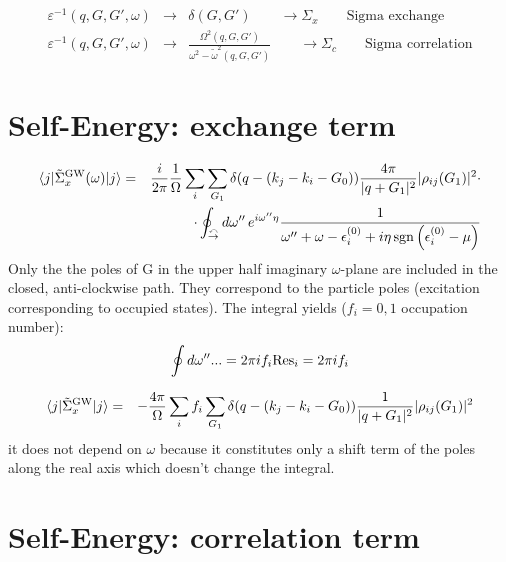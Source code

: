 \documentclass[fleqn]{article}
\begin{document}
\begin{eqnarray*}
\varepsilon^{-1}(q,G,G',\omega) &\rightarrow& \delta(G,G')
  \qquad \rightarrow \Sigma_x \qquad \textrm{Sigma exchange} \\
  \varepsilon^{-1}(q,G,G',\omega) &\rightarrow&
  \frac{\Omega^2(q,G,G')}{\omega^2 - \tilde{\omega}^2(q,G,G')}
  \qquad \rightarrow \Sigma_c \qquad \textrm{Sigma correlation}
\end{eqnarray*}

\section{Self-Energy: exchange term}

\begin{eqnarray*}
\langle j | \tilde{\Sigma}^{\rm GW}_{x}(\omega) | j \rangle
&=&  \frac{i}{2 \pi} \frac{1}{\Omega} \sum_i \sum_{G_1} \delta(q-(k_j - k_i - G_0))
   \frac{4\pi}{|q+G_1|^2}
  | \rho_{ij}(G_1)|^2  \cdot \\ && \cdot
  \oint_{{\overset{\curvearrowleft}{\rightarrow}}} d\omega'' \, e^{i \omega'' \eta}
   \frac{1}{\omega'' + \omega - \epsilon^{(0)}_i + i \eta \mathrm{\, sgn} \left( \epsilon^{(0)}_i - \mu \right)}
\end{eqnarray*}
Only the the poles of G in the upper half imaginary $\omega$-plane are included
in the closed, anti-clockwise path. They correspond to the particle poles
(excitation corresponding to occupied states).
The integral yields ($f_i=0,1$ occupation number):
\[
\oint d\omega'' ... = 2 \pi i f_i {\rm Res}_i = 2 \pi i f_i
\]

\begin{eqnarray*}
\langle j | \tilde{\Sigma}^{\rm GW}_{x} | j \rangle
&=&  - \frac{4 \pi}{\Omega} \sum_i f_i \sum_{G_1} \delta(q-(k_j - k_i - G_0))
   \frac{1}{|q+G_1|^2}
  | \rho_{ij}(G_1) |^2
\end{eqnarray*}
it does not depend on $\omega$ because it constitutes only a shift
term of the poles along the real axis which doesn't change the integral.

\newpage

\section{Self-Energy: correlation term}
\end{document}
